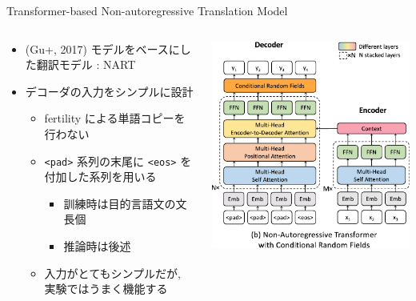 \documentclass[unicode, 12pt, aspectratio=43]{beamer}
\begin{document}
\begin{frame}[containsverbatim,label={sec:orgabf90fa}]{\normalsize Transformer-based Non-autoregressive Translation Model}
\begin{columns}
\begin{column}{0.6\columnwidth}
\begin{itemize}
\item (Gu+, 2017) モデルをベースにした翻訳モデル : NART
\item デコーダの入力をシンプルに設計
\begin{itemize}
\item fertility による単語コピーを行わない
\item \verb|<pad>| 系列の末尾に \verb|<eos>| を付加した系列を用いる
\begin{itemize}
\item 訓練時は目的言語文の文長個
\item 推論時は後述
\end{itemize}
\item 入力がとてもシンプルだが, 実験ではうまく機能する
\end{itemize}
\end{itemize}
\end{column}

\begin{column}{0.4\columnwidth}
\begin{center}
\includegraphics[width=1.0\linewidth]{./figure/Figure1_b.pdf}
\end{center}
\end{column}
\end{columns}
\end{frame}
\end{document}
